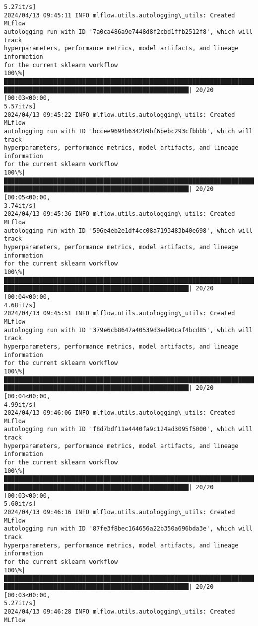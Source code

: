 \documentclass[11pt]{article}
\begin{document}
\begin{Verbatim}[commandchars=\\\{\}]
5.27it/s]
2024/04/13 09:45:11 INFO mlflow.utils.autologging\_utils: Created MLflow
autologging run with ID '7a0ca486a9e7448d8f2cbd1ffb2512f8', which will track
hyperparameters, performance metrics, model artifacts, and lineage information
for the current sklearn workflow
100\%|███████████████████████████████████████████████████████████████████████████
████████████████████████████████████████████████████| 20/20 [00:03<00:00,
5.57it/s]
2024/04/13 09:45:22 INFO mlflow.utils.autologging\_utils: Created MLflow
autologging run with ID 'bccee9694b6342b9bf6bebc293cfbbbb', which will track
hyperparameters, performance metrics, model artifacts, and lineage information
for the current sklearn workflow
100\%|███████████████████████████████████████████████████████████████████████████
████████████████████████████████████████████████████| 20/20 [00:05<00:00,
3.74it/s]
2024/04/13 09:45:36 INFO mlflow.utils.autologging\_utils: Created MLflow
autologging run with ID '596e4eb2e1df4cc08a7193483b40e698', which will track
hyperparameters, performance metrics, model artifacts, and lineage information
for the current sklearn workflow
100\%|███████████████████████████████████████████████████████████████████████████
████████████████████████████████████████████████████| 20/20 [00:04<00:00,
4.68it/s]
2024/04/13 09:45:51 INFO mlflow.utils.autologging\_utils: Created MLflow
autologging run with ID '379e6cb8647a40539d3ed90caf4bcd85', which will track
hyperparameters, performance metrics, model artifacts, and lineage information
for the current sklearn workflow
100\%|███████████████████████████████████████████████████████████████████████████
████████████████████████████████████████████████████| 20/20 [00:04<00:00,
4.99it/s]
2024/04/13 09:46:06 INFO mlflow.utils.autologging\_utils: Created MLflow
autologging run with ID 'f8d7bdf11e4440fa9c124ad3095f5000', which will track
hyperparameters, performance metrics, model artifacts, and lineage information
for the current sklearn workflow
100\%|███████████████████████████████████████████████████████████████████████████
████████████████████████████████████████████████████| 20/20 [00:03<00:00,
5.60it/s]
2024/04/13 09:46:16 INFO mlflow.utils.autologging\_utils: Created MLflow
autologging run with ID '87fe3f8bec164656a22b350a696bda3e', which will track
hyperparameters, performance metrics, model artifacts, and lineage information
for the current sklearn workflow
100\%|███████████████████████████████████████████████████████████████████████████
████████████████████████████████████████████████████| 20/20 [00:03<00:00,
5.27it/s]
2024/04/13 09:46:28 INFO mlflow.utils.autologging\_utils: Created MLflow

\end{Verbatim}
\end{document}
